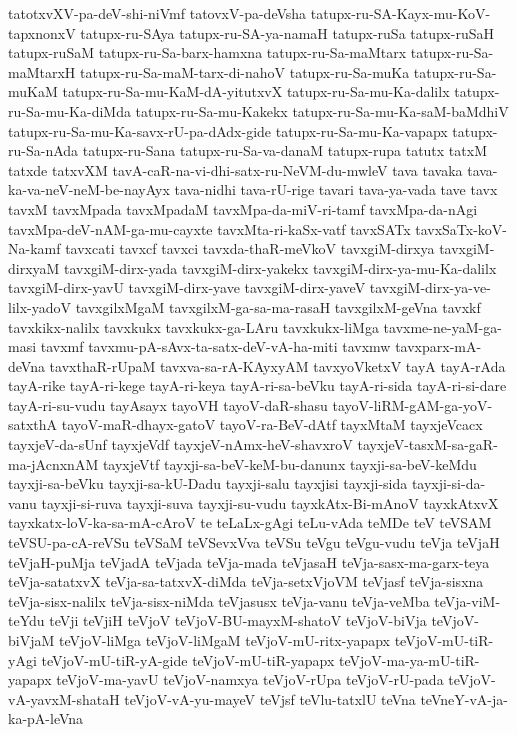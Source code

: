 {tatotxvXV-pa-deV-shi-niVmf
tatovxV-pa-deVsha
tatupx-ru-SA-Kayx-mu-KoV-tapxnonxV
tatupx-ru-SAya
tatupx-ru-SA-ya-namaH
tatupx-ruSa
tatupx-ruSaH
tatupx-ruSaM
tatupx-ru-Sa-barx-hamxna
tatupx-ru-Sa-maMtarx
tatupx-ru-Sa-maMtarxH
tatupx-ru-Sa-maM-tarx-di-nahoV
tatupx-ru-Sa-muKa
tatupx-ru-Sa-muKaM
tatupx-ru-Sa-mu-KaM-dA-yitutxvX
tatupx-ru-Sa-mu-Ka-dalilx
tatupx-ru-Sa-mu-Ka-diMda
tatupx-ru-Sa-mu-Kakekx
tatupx-ru-Sa-mu-Ka-saM-baMdhiV
tatupx-ru-Sa-mu-Ka-savx-rU-pa-dAdx-gide
tatupx-ru-Sa-mu-Ka-vapapx
tatupx-ru-Sa-nAda
tatupx-ru-Sana
tatupx-ru-Sa-va-danaM
tatupx-rupa
tatutx
tatxM
tatxde
tatxvXM
tavA-caR-na-vi-dhi-satx-ru-NeVM-du-mwleV
tava
tavaka
tava-ka-va-neV-neM-be-nayAyx
tava-nidhi
tava-rU-rige
tavari
tava-ya-vada
tave
tavx
tavxM
tavxMpada
tavxMpadaM
tavxMpa-da-miV-ri-tamf
tavxMpa-da-nAgi
tavxMpa-deV-nAM-ga-mu-cayxte
tavxMta-ri-kaSx-vatf
tavxSATx
tavxSaTx-koV-Na-kamf
tavxcati
tavxcf
tavxci
tavxda-thaR-meVkoV
tavxgiM-dirxya
tavxgiM-dirxyaM
tavxgiM-dirx-yada
tavxgiM-dirx-yakekx
tavxgiM-dirx-ya-mu-Ka-dalilx
tavxgiM-dirx-yavU
tavxgiM-dirx-yave
tavxgiM-dirx-yaveV
tavxgiM-dirx-ya-ve-lilx-yadoV
tavxgilxMgaM
tavxgilxM-ga-sa-ma-rasaH
tavxgilxM-geVna
tavxkf
tavxkikx-nalilx
tavxkukx
tavxkukx-ga-LAru
tavxkukx-liMga
tavxme-ne-yaM-ga-masi
tavxmf
tavxmu-pA-sAvx-ta-satx-deV-vA-ha-miti
tavxmw
tavxparx-mA-deVna
tavxthaR-rUpaM
tavxva-sa-rA-KAyxyAM
tavxyoVketxV
tayA
tayA-rAda
tayA-rike
tayA-ri-kege
tayA-ri-keya
tayA-ri-sa-beVku
tayA-ri-sida
tayA-ri-si-dare
tayA-ri-su-vudu
tayAsayx
tayoVH
tayoV-daR-shasu
tayoV-liRM-gAM-ga-yoV-satxthA
tayoV-maR-dhayx-gatoV
tayoV-ra-BeV-dAtf
tayxMtaM
tayxjeVcacx
tayxjeV-da-sUnf
tayxjeVdf
tayxjeV-nAmx-heV-shavxroV
tayxjeV-tasxM-sa-gaR-ma-jAcnxnAM
tayxjeVtf
tayxji-sa-beV-keM-bu-danunx
tayxji-sa-beV-keMdu
tayxji-sa-beVku
tayxji-sa-kU-Dadu
tayxji-salu
tayxjisi
tayxji-sida
tayxji-si-da-vanu
tayxji-si-ruva
tayxji-suva
tayxji-su-vudu
tayxkAtx-Bi-mAnoV
tayxkAtxvX
tayxkatx-loV-ka-sa-mA-cAroV
te
teLaLx-gAgi
teLu-vAda
teMDe
teV
teVSAM
teVSU-pa-cA-reVSu
teVSaM
teVSevxVva
teVSu
teVgu
teVgu-vudu
teVja
teVjaH
teVjaH-puMja
teVjadA
teVjada
teVja-mada
teVjasaH
teVja-sasx-ma-garx-teya
teVja-satatxvX
teVja-sa-tatxvX-diMda
teVja-setxVjoVM
teVjasf
teVja-sisxna
teVja-sisx-nalilx
teVja-sisx-niMda
teVjasusx
teVja-vanu
teVja-veMba
teVja-viM-teYdu
teVji
teVjiH
teVjoV
teVjoV-BU-mayxM-shatoV
teVjoV-biVja
teVjoV-biVjaM
teVjoV-liMga
teVjoV-liMgaM
teVjoV-mU-ritx-yapapx
teVjoV-mU-tiR-yAgi
teVjoV-mU-tiR-yA-gide
teVjoV-mU-tiR-yapapx
teVjoV-ma-ya-mU-tiR-yapapx
teVjoV-ma-yavU
teVjoV-namxya
teVjoV-rUpa
teVjoV-rU-pada
teVjoV-vA-yavxM-shataH
teVjoV-vA-yu-mayeV
teVjsf
teVlu-tatxlU
teVna
teVneY-vA-ja-ka-pA-leVna
}
